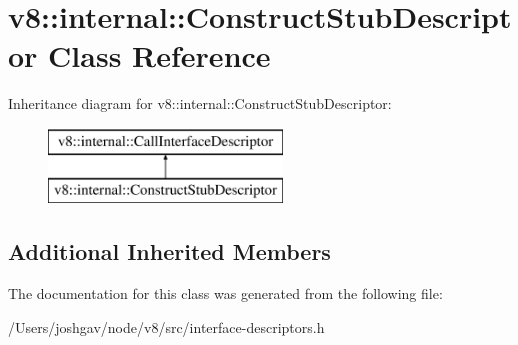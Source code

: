 \hypertarget{classv8_1_1internal_1_1_construct_stub_descriptor}{}\section{v8\+:\+:internal\+:\+:Construct\+Stub\+Descriptor Class Reference}
\label{classv8_1_1internal_1_1_construct_stub_descriptor}
Inheritance diagram for v8\+:\+:internal\+:\+:Construct\+Stub\+Descriptor\+:\begin{figure}[H]
\begin{center}
\leavevmode
\includegraphics[height=2.000000cm]{classv8_1_1internal_1_1_construct_stub_descriptor}
\end{center}
\end{figure}
\subsection*{Additional Inherited Members}


The documentation for this class was generated from the following file\+:\begin{DoxyCompactItemize}
\item 
/\+Users/joshgav/node/v8/src/interface-\/descriptors.\+h\end{DoxyCompactItemize}
